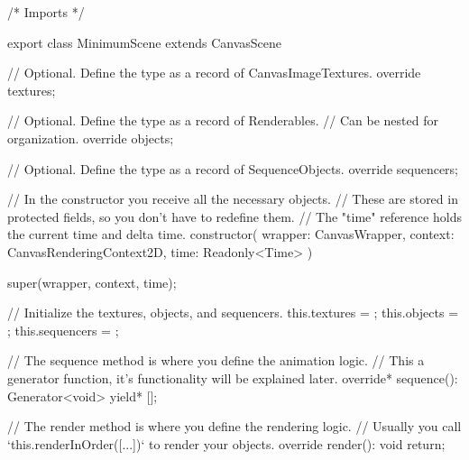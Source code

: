 /* Imports */

export class MinimumScene extends CanvasScene {
    // Optional. Define the type as a record of CanvasImageTextures.
    override textures;   

    // Optional. Define the type as a record of Renderables. 
    // Can be nested for organization.
    override objects;   
    
    // Optional. Define the type as a record of SequenceObjects.
    override sequencers;
    
    // In the constructor you receive all the necessary objects. 
    // These are stored in protected fields, so you don't have to redefine them.
    // The "time" reference holds the current time and delta time.
    constructor(
        wrapper: CanvasWrapper,
        context: CanvasRenderingContext2D,
        time: Readonly<Time>
    ) {
        super(wrapper, context, time);

        // Initialize the textures, objects, and sequencers.
        this.textures   = {};
        this.objects    = {};
        this.sequencers = {};
    }

    // The sequence method is where you define the animation logic.
    // This a generator function, it's functionality will be explained later.
    override* sequence(): Generator<void> {
        yield* [];
    }

    // The render method is where you define the rendering logic.
    // Usually you call `this.renderInOrder([...])` to render your objects.
    override render(): void {
        return;
    }
}
